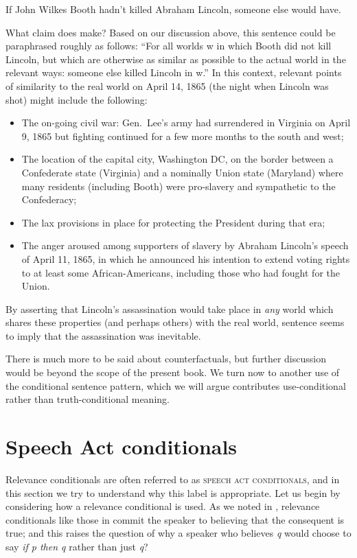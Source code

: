 \ea \label{ex:19.39}
If John Wilkes Booth hadn’t killed Abraham Lincoln, someone else would have.
\z


What claim does  make? Based on our discussion above, this sentence could be paraphrased roughly as follows: “For all worlds w in which Booth did not kill Lincoln, but which are otherwise as similar as possible to the actual world in the relevant ways: someone else killed Lincoln in w.” In this context, relevant points of similarity to the real world on April 14, 1865 (the night when Lincoln was shot) might include the following:

\begin{itemize}
\item The on-going civil war: Gen.~Lee’s army had surrendered in Virginia on April 9, 1865 but fighting continued for a few more months to the south and west;
\item The location of the capital city, Washington DC, on the border between a Confederate state (Virginia) and a nominally Union state (Maryland) where many residents (including Booth) were pro-slavery and sympathetic to the Confederacy;
\item The lax provisions in place for protecting the President during that era;
\item The anger aroused among supporters of slavery by Abraham Lincoln’s speech of April 11, 1865, in which he announced his intention to extend voting rights to at least some African-Americans, including those who had fought for the Union.
\end{itemize}

By asserting that Lincoln’s assassination would take place in \textit{any} world which shares these properties (and perhaps others) with the real world, sentence  seems to imply that the assassination was inevitable.



There is much more to be said about counterfactuals, but further discussion would be beyond the scope of the present book. We turn now to another use of the conditional sentence pattern, which we will argue contributes use-condi\-tion\-al rather than truth-conditional meaning.


\section{Speech Act conditionals}\label{sec:19.7}

Relevance conditionals are often referred to as \textsc{speech act conditionals}, and in this section we try to understand why this label is appropriate. Let us begin by considering how a relevance conditional is used. As we noted in , relevance conditionals like those in  commit the speaker to believing that the consequent is true; and this raises the question of why a speaker who believes \textit{q} would choose to say \textit{if p then q} rather than just \textit{q}?


